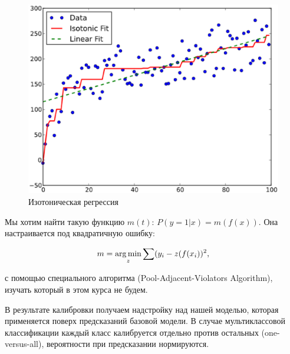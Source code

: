 \documentclass[12pt,a4paper]{article}
\begin{document}
\begin{center}
\begin{figure}[!htb]
 \centering
 \includegraphics[width=0.7\linewidth]{img/isotonic.eps}
 \caption{Изотоническая регрессия}\label{fig:isotonic}
\end{figure}
\end{center}

Мы хотим найти такую функцию $m(t)$: $P(y = 1 | x) = m(f(x))$. Она настраивается под квадратичную ошибку:

$$m = \mathop{\rm arg\,min}\limits_{z} \sum (y_i - z(f(x_i))^2,$$

с помощью специального алгоритма (Pool-Adjacent-Violators Algorithm), изучать который в этом курса не будем.

В результате калибровки получаем надстройку над нашей моделью, которая применяется поверх предсказаний базовой модели. В случае мультиклассовой классификации каждый класс калибруется отдельно против остальных (one-versus-all), вероятности при предсказании нормируются.
\end{document}
